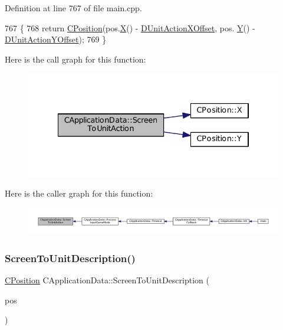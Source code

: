 Definition at line 767 of file main.\+cpp.


\begin{DoxyCode}
767                                                                   \{
768     \textcolor{keywordflow}{return} \hyperlink{classCPosition}{CPosition}(pos.\hyperlink{classCPosition_a9a6b94d3b91df1492d166d9964c865fc}{X}() - \hyperlink{classCApplicationData_aa47b53d283617575a4866c08d83e27c4}{DUnitActionXOffset}, pos.
      \hyperlink{classCPosition_a1aa8a30e2f08dda1f797736ba8c13a87}{Y}() - \hyperlink{classCApplicationData_a8ccfb55bd25cba0e6eb66573ba9c8b3c}{DUnitActionYOffset});
769 \}
\end{DoxyCode}
Here is the call graph for this function\+:\nopagebreak
\begin{figure}[H]
\begin{center}
\leavevmode
\includegraphics[width=334pt]{classCApplicationData_a2d956280cfd6074f56db3753c7467248_cgraph}
\end{center}
\end{figure}
Here is the caller graph for this function\+:\nopagebreak
\begin{figure}[H]
\begin{center}
\leavevmode
\includegraphics[width=350pt]{classCApplicationData_a2d956280cfd6074f56db3753c7467248_icgraph}
\end{center}
\end{figure}
\hypertarget{classCApplicationData_a5400b710281ac2671d8d76aa442124ec}{}\label{classCApplicationData_a5400b710281ac2671d8d76aa442124ec} 
\subsubsection{\texorpdfstring{Screen\+To\+Unit\+Description()}{ScreenToUnitDescription()}}
{\footnotesize\ttfamily \hyperlink{classCPosition}{C\+Position} C\+Application\+Data\+::\+Screen\+To\+Unit\+Description (\begin{DoxyParamCaption}\item[{const \hyperlink{classCPosition}{C\+Position} \&}]{pos }\end{DoxyParamCaption})\hspace{0.3cm}{\ttfamily [protected]}}




